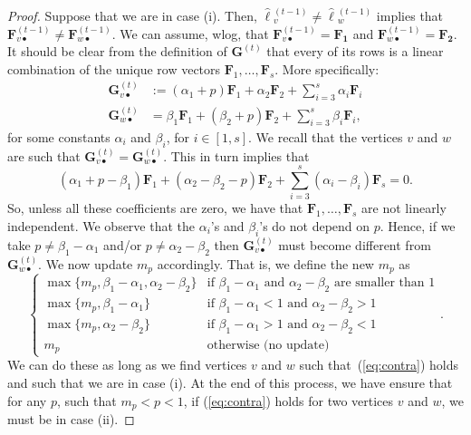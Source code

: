 \begin{proof}
Suppose that we are in case (i). Then,  $\hat{\pmb{\ell}}{}^{(t-1)}_v\neq\hat{\pmb{\ell}}{}^{(t-1)}_w$ implies that
$\mathbf{F}^{(t-1)}_{v\bullet}\neq \mathbf{F}^{(t-1)}_{w\bullet}$. We can assume, wlog, that $\mathbf{F}^{(t-1)}_{v\bullet}=\mathbf{F_1}$ and
$\mathbf{F}^{(t-1)}_{w\bullet}=\mathbf{F_2}$. It should be clear from the definition of $\mathbf{G}^{(t)}$ that every of its rows is a linear combination of 
the unique row vectors $\mathbf{F}_1,\ldots,\mathbf{F}_s$. More specifically:
\begin{align*}
\mathbf{G}^{(t)}_{v\bullet}&:=(\alpha_1+p)\mathbf{F}_1+ \alpha_2\mathbf{F}_2+ \sum_{i=3}^s \alpha_i\mathbf{F}_i\\
\mathbf{G}^{(t)}_{w\bullet}&=\beta_1\mathbf{F}_1+ (\beta_2+p)\mathbf{F}_2+ \sum_{i=3}^s \beta_i\mathbf{F}_i,
\end{align*}
for some constants $\alpha_i$ and $\beta_i$, for $i\in[1,s]$.
We recall that the vertices $v$ and $w$ are such that $\mathbf{G}^{(t)}_{v\bullet}=\mathbf{G}^{(t)}_{w\bullet}$. This in turn implies that
$$
(\alpha_1+p-\beta_1)\mathbf{F}_1 + (\alpha_2-\beta_2-p)\mathbf{F}_2 +\sum_{i=3}^s (\alpha_i-\beta_i)\mathbf{F}_s=0.
$$
So, unless all these coefficients are zero, we have that $\mathbf{F}_1,\ldots,\mathbf{F}_s$
are not linearly independent. We observe that the $\alpha_i$'s and $\beta_i$'s do not depend on $p$. Hence, if we take  $p\neq \beta_1-\alpha_1$ and/or $p\neq \alpha_2-\beta_2$ then $\mathbf{G}^{(t)}_{v\bullet}$ must become different from $\mathbf{G}^{(t)}_{w\bullet}$. We now update $m_p$ accordingly. That is,
we define the new $m_p$ as
$$
\begin{cases}
\max\{m_p,\beta_1-\alpha_1,\alpha_2-\beta_2\} & \text{if $\beta_1-\alpha_1$ and $\alpha_2-\beta_2$ are smaller than $1$}\\
\max\{m_p,\beta_1-\alpha_1\} & \text{if $\beta_1-\alpha_1<1$ and $\alpha_2-\beta_2>1$}\\
\max\{m_p,\alpha_2-\beta_2\} & \text{if $\beta_1-\alpha_1>1$ and $\alpha_2-\beta_2<1$}\\
m_p &\text{otherwise (no update)}
\end{cases}.
$$
We can do these as long as we find vertices $v$ and $w$ such that~(\ref{eq:contra}) holds and such that we are in case (i). At the end of this process, we have ensure that for any $p$, such that $m_p < p< 1$, if (\ref{eq:contra}) holds for two vertices $v$ and $w$, we must be in case (ii).


\end{proof}
